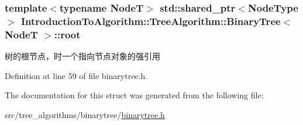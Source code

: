 \subsubsection[{root}]{\setlength{\rightskip}{0pt plus 5cm}template$<$typename Node\+T$>$ std\+::shared\+\_\+ptr$<${\bf Node\+Type}$>$ {\bf Introduction\+To\+Algorithm\+::\+Tree\+Algorithm\+::\+Binary\+Tree}$<$ Node\+T $>$\+::root}\label{struct_introduction_to_algorithm_1_1_tree_algorithm_1_1_binary_tree_aa0d43af70ef50ff59740dced2e832074}
树的根节点，时一个指向节点对象的强引用 

Definition at line 59 of file binarytree.\+h.



The documentation for this struct was generated from the following file\+:\begin{DoxyCompactItemize}
\item 
src/tree\+\_\+algorithms/binarytree/\hyperlink{binarytree_8h}{binarytree.\+h}\end{DoxyCompactItemize}

